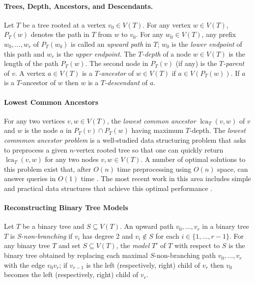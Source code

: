 \documentclass[a4paper,UKenglish,autoref]{lipics-v2021}
\DeclareMathOperator{\lca}{lca}
\begin{document}
\paragraph{Trees, Depth, Ancestors, and Descendants.}

Let $T$ be a tree rooted at a vertex $v_0\in V(T)$.  For any vertex $w\in V(T)$, $P_T(w)$ denotes the path in $T$ from $w$ to $v_0$.  For any $w_0\in V(T)$, any prefix $w_0,\ldots,w_r$ of $P_T(w_0)$ is called an \emph{upward path} in $T$; $w_0$ is the \emph{lower endpoint} of this path and $w_r$ is the \emph{upper endpoint}.  The \emph{$T$-depth} of a node $w\in V(T)$ is the length of the path $P_T(w)$. The second node in $P_T(v)$ (if any) is the \emph{$T$-parent} of $v$.  A vertex $a\in V(T)$ is a \emph{$T$-ancestor} of $w\in V(T)$ if $a\in V(P_T(w))$. If $a$ is a $T$-ancestor of $w$ then $w$ is a \emph{$T$-descendant} of $a$.



\paragraph{Lowest Common Ancestors}

For any two vertices $v,w\in V(T)$, the \emph{lowest common ancestor} $\lca_T(v,w)$ of $v$ and $w$ is the node $a$ in $P_T(v)\cap P_T(w)$ having maximum $T$-depth.  The \emph{lowest commmon ancestor problem} is a well-studied data structuring problem that asks to preprocess a given $n$-vertex rooted tree so that one can quickly return $\lca_T(v,w)$ for any two nodes $v,w\in V(T)$. A number of optimal solutions to this problem exist that, after $O(n)$ time preprocessing using $O(n)$ space, can answer queries in $O(1)$ time \cite{berman.vishkin:recursive,shieber.vishkin:on,harel.tarjan:fast,alstrup.gavoille.ea:nearest,bender.farach-colton:lca,fischer.heun:theoretical}.  The most recent work in this area includes simple and practical data structures that achieve this optimal performance \cite{alstrup.gavoille.ea:nearest,bender.farach-colton:lca,fischer.heun:theoretical}.

\paragraph{Reconstructing Binary Tree Models}

Let $T$ be a binary tree and $S \subseteq V(T)$. An upward path $v_0,\ldots,v_r$ in a binary tree $T$ is \emph{S-non-branching} if $v_{i}$ has degree 2 and $v_i \notin S$ for each $i\in\{1,\ldots,r-1\}$. For any binary tree $T$ and set $S \subseteq V(T)$, the \emph{model} $T'$ of $T$ with respect to $S$ is the binary tree obtained by replacing each maximal $S$-non-branching path $v_0,\ldots,v_r$ with the edge $v_0v_r$; if $v_{r-1}$ is the left (respectively, right) child of $v_r$ then $v_0$ becomes the left (respectively, right) child of $v_r$.
\end{document}
